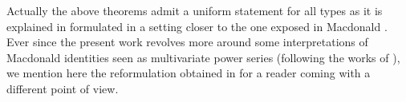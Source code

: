 \documentclass[11pt,letterpaper]{amsart}
\newcommand{\fh}{\mathfrak{h}}
\newcommand{\fg}{\mathfrak{g}}
\newcommand{\scal}[2]{\langle #1,#2\rangle}
\newcommand{\qu}[1]{\quad\text{#1}\quad}
\newcommand{\Z}{\mathbb{Z}}
\newcommand{\al}{\alpha}
\newcommand{\La}{\Lambda}
\numberwithin{equation}{section}
\numberwithin{df}{section}
\begin{document}
 
Actually the above theorems admit a uniform statement for all types as it is explained in \cite{LW} formulated in a setting closer to the one exposed in Macdonald \cite{Mac}. Ever since the present work revolves more around some interpretations of Macdonald identities seen as multivariate power series (following the works of \cite{Stanton,RS}), we mention here the reformulation obtained in \cite{LW} for a reader coming with a different point of view.
%
%
%
%
%
%
%
\end{document}

